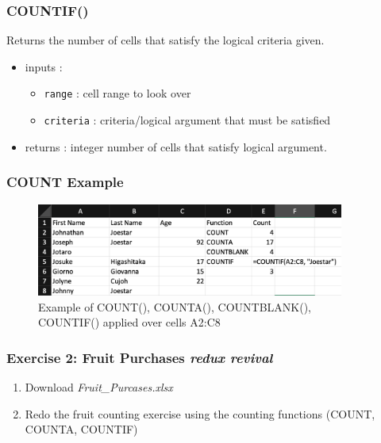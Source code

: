 \documentclass[12pt]{beamer}
\begin{document}
\begin{frame}
	\frametitle{COUNTIF()}
		Returns the number of cells that satisfy the logical criteria given.
		\begin{itemize}
			\item inputs :
			\begin{itemize}
				\item \texttt{range} : cell range to look over
				\item \texttt{criteria} : criteria/logical argument that must be satisfied 
			\end{itemize}
			\item returns : integer number of cells that satisfy logical argument. 
		\end{itemize}
\end{frame}
\begin{frame}
	\frametitle{COUNT Example}
	\begin{figure}
		\begin{center}
			\includegraphics[width=0.9\textwidth]{COUNTEXAMPLE.png}
			\caption{Example of COUNT(), COUNTA(), COUNTBLANK(), COUNTIF() applied over cells A2:C8}
	\end{center}
	\end{figure}
\end{frame}
\begin{frame}
	\frametitle{Exercise 2: Fruit Purchases \textit{redux revival}}
	\begin{enumerate}
		\item Download \textit{Fruit\_Purcases.xlsx}
		\item Redo the fruit counting exercise using the counting functions (COUNT, COUNTA, COUNTIF)
	\end{enumerate}
\end{frame}
\end{document}
